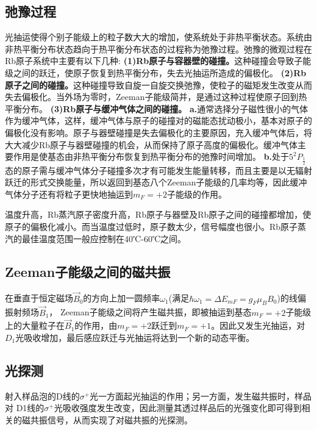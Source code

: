 \documentclass[UTF8]{ctexart}
\begin{document}
\begin{multicols}{2}
\subsection{弛豫过程}
光抽运使得个别子能级上的粒子数大大的增加，使系统处于非热平衡状态。系统由非热平衡分布状态趋向于热平衡分布状态的过程称为弛豫过程。弛豫的微观过程在Rb原子系统中主要有以下几种:
\newline\textbf{(1)Rb原子与容器壁的碰撞。}这种碰撞会导致子能级之间的跃迁，使原子恢复到热平衡分布，失去光抽运所造成的偏极化。
\newline\textbf{(2)Rb原子之间的碰撞。}这种碰撞导致自旋一自旋交换弛豫，使粒子的磁矩发生改变从而失去偏极化。当外场为零时，Zeeman子能级简并，是通过这种过程使原子回到热平衡分布。
\newline\textbf{(3)Rb原子与缓冲气体之间的碰撞。}
\newline\textbf{a.}通常选择分子磁性很小的气体作为缓冲气体，这样，缓冲气体与原子的碰撞对的磁能态扰动极小，基本对原子的偏极化没有影响。原子与器壁碰撞是失去偏极化的主要原因，充入缓冲气体后，将大大减少Rb原子与器壁碰撞的机会，从而保持了原子高度的偏极化。缓冲气体主要作用是使基态由非热平衡分布恢复到热平衡分布的弛豫时间增加。
\newline\textbf{b.}处于$5^2P_{\frac{1}{2}}$态的原子需与缓冲气体分子碰撞多次才有可能发生能量转移，而且主要是以无辐射跃迁的形式交换能量，所以返回到基态八个Zeeman子能级的几率均等，因此缓冲气体分子还有将粒子更快地抽运到$m_F=+2$子能级的作用。

温度升高，Rb蒸汽原子密度升高，Rb原子与器壁及Rb原子之间的碰撞都增加，使原子的偏极化减小。而当温度过低时，原子数太少，信号幅度也很小。Rb原子蒸汽的最佳温度范围一般应控制在40℃-60℃之间。

\subsection{Zeeman子能级之间的磁共振}
在垂直于恒定磁场$\vec{B}_{0}$的方向上加一圆频率$\omega_1$(满足$\hbar \omega_{1}=\Delta E_{m F}=g_{F} \mu_{B} B_{0}$)的线偏振射频场$\vec{B}_{1}$， Zeeman子能级之间将产生磁共振，即被抽运到基态$m_F=+2$子能级上的大量粒子在$\vec{B}_{1}$的作用，由$m_F=+2$跃迁到$m_F=+1$。因此又发生光抽运，对$D_1$光吸收增加，最后感应跃迁与光抽运将达到一个新的动态平衡。
\subsection{光探测}
射入样品泡的D线的$\sigma^+$光一方面起光抽运的作用；另一方面，发生磁共振时，样品对
D1线的$\sigma^+$光吸收强度发生改变，因此测量其透过样品后的光强变化即可得到相关的磁共振信号，从而实现了对磁共振的光探测。


\end{multicols}
\end{document}

